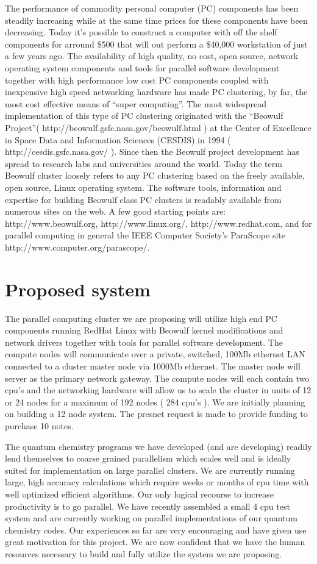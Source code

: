 The performance of commodity personal computer (PC) components has been
steadily increasing while at the same time prices for these components have
been decreasing. Today it's possible to construct a computer with off the
shelf components for arround \$500 that will out perform a \$40,000
workstation
of just a few years ago. The availability of high quality, no cost, open
source, network operating system components and tools for parallel software
development together with high performance low cost PC components coupled with
inexpensive high speed networking hardware has made PC clustering, by far, the
most cost effective means of ``super computing''.
The most widespread implementation of this type of PC clustering originated
with the ``Beowulf Project''( http://beowulf.gsfc.nasa.gov/beowulf.html ) at
the Center of Excellence in Space Data and Information Sciences (CESDIS)
in
1994 ( http://cesdis.gsfc.nasa.gov/ ). Since then the Beowulf project
development has spread to research labs and universities around the world.
Today the term Beowulf cluster loosely refers to any PC clustering based on
the freely available, open source, Linux operating system. The software tools,
information and expertise for building Beowulf class PC clusters is readably
available from numerous sites on the web. A few good starting points are:
http://www.beowulf.org, http://www.linux.org/, http://www.redhat.com, and for
parallel computing in general the 
IEEE Computer Society's ParaScope 
site http://www.computer.org/parascope/.

\section{Proposed system}

The parallel computing cluster we are proposing will utilize high end PC
components running RedHat Linux with Beowulf kernel modifications and network
drivers together with tools for parallel software development. The compute
nodes will communicate over a private, switched, 100Mb ethernet LAN connected
to a cluster master node via 1000Mb ethernet. The master node will server as
the primary network gateway. The compute nodes will each contain two cpu's and
the networking hardware will allow us to scale the cluster in units of 12 or
24 nodes for a maximum of 192 nodes ( 284 cpu's ). We are initially planning
on building a 12 node system. The presnet request is made to provide
funding to purchase 10 notes.

The quantum chemistry programs we have developed (and are developing) readily
lend themselves to coarse grained parallelism which scales well and is ideally
suited for implementation on large parallel clusters. We are currently running
large, high accuracy calculations which require weeks or months of cpu time
with well optimized efficient algorithms. Our only logical recourse to
increase productivity is to go parallel. We have recently assembled a small 4
cpu test system and are currently working on parallel implementations of our
quantum chemistry codes. Our experiences so far are very encouraging and have
given use great motivation for this project. We are now confident that we have
the human resources necessary to build 
and fully utilize the system we are proposing.

